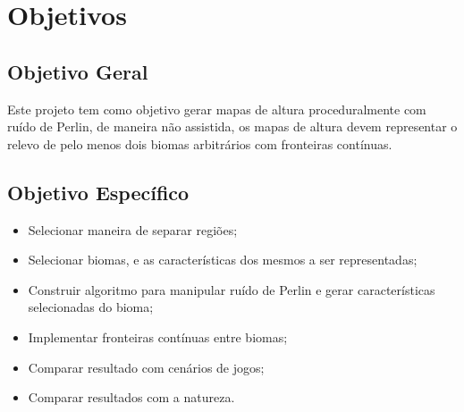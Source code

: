 \chapter{Objetivos}

\section{Objetivo Geral}
Este projeto tem como objetivo gerar mapas de altura proceduralmente com ruído 
de Perlin, de maneira não assistida, os mapas de altura devem representar o 
relevo de pelo menos dois biomas arbitrários com fronteiras contínuas.


\section{Objetivo Específico}

\begin{itemize}
    \item Selecionar maneira de separar regiões;
    \item Selecionar biomas, e as características dos mesmos a ser representadas;
    \item Construir algoritmo para manipular ruído de Perlin e gerar características
        selecionadas do bioma;
    \item Implementar fronteiras contínuas entre biomas;
    \item Comparar resultado com cenários de jogos;
    \item Comparar resultados com a natureza.
\end{itemize}





